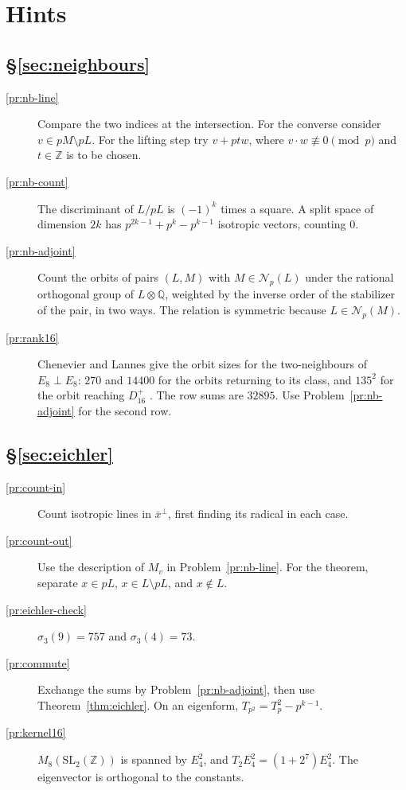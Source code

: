 \documentclass[reqno]{amsart}
\theoremstyle{definition}
\theoremstyle{plain}
\newcommand{\Z}{\mathbb{Z}}
\newcommand{\Q}{\mathbb{Q}}
\newcommand{\Nb}{\mathcal{N}}
\begin{document}
\section*{Hints}

\subsection*{\S\ref{sec:neighbours}}
\begin{description}
\item[\ref{pr:nb-line}] Compare the two indices at the intersection.  For the converse consider \(v\in pM\setminus pL\).  For the lifting step try \(v+ptw\), where \(v\cdot w\not\equiv0\pmod p\) and \(t\in\Z\) is to be chosen.
\item[\ref{pr:nb-count}] The discriminant of \(L/pL\) is \((-1)^k\) times a square.  A split space of dimension \(2k\) has \(p^{2k-1} + p^k - p^{k-1}\) isotropic vectors, counting \(0\).
\item[\ref{pr:nb-adjoint}] Count the orbits of pairs \((L,M)\) with \(M\in\Nb_p(L)\) under the rational orthogonal group of \(L\otimes\Q\), weighted by the inverse order of the stabilizer of the pair, in two ways.  The relation is symmetric because \(L \in \Nb_p(M)\).
\item[\ref{pr:rank16}] Chenevier and Lannes give the orbit sizes for the two-neighbours of \(E_8\perp E_8\): \(270\) and \(14400\) for the orbits returning to its class, and \(135^2\) for the orbit reaching \(D_{16}^+\) \cite[Ch.~III, \S3.1]{CL}.  The row sums are \(32895\).  Use Problem~\ref{pr:nb-adjoint} for the second row.
\end{description}

\subsection*{\S\ref{sec:eichler}}
\begin{description}
\item[\ref{pr:count-in}] Count isotropic lines in \(\bar x^\perp\), first finding its radical in each case.
\item[\ref{pr:count-out}] Use the description of \(M_v\) in Problem~\ref{pr:nb-line}.  For the theorem, separate \(x\in pL\), \(x\in L\setminus pL\), and \(x\notin L\).
\item[\ref{pr:eichler-check}] \(\sigma_3(9) = 757\) and \(\sigma_3(4) = 73\).
\item[\ref{pr:commute}] Exchange the sums by Problem~\ref{pr:nb-adjoint}, then use Theorem~\ref{thm:eichler}.  On an eigenform, \(T_{p^2} = T_p^2 - p^{k-1}\).
\item[\ref{pr:kernel16}] \(M_8(\mathrm{SL}_2(\Z))\) is spanned by \(E_4^2\), and \(T_2 E_4^2 = (1 + 2^7)E_4^2\).  The eigenvector is orthogonal to the constants.
\end{description}
\end{document}
